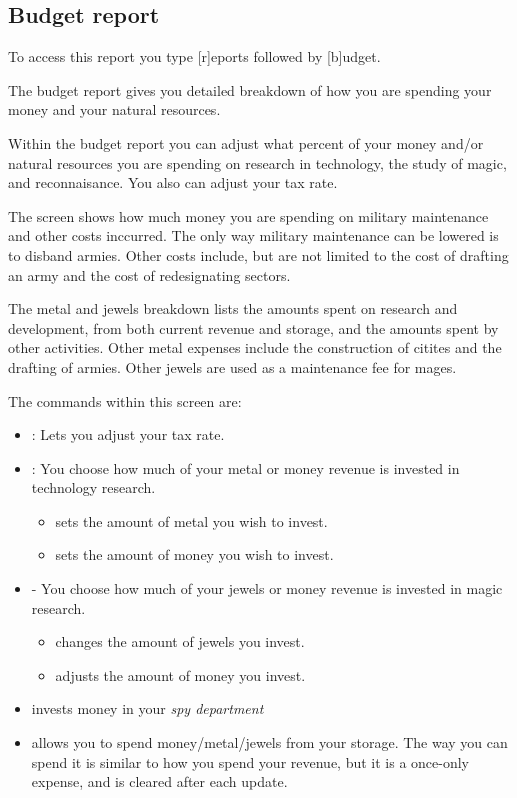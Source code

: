 \subsection{Budget report}
\label{sec-budget-report}
To access this report you type [r]eports followed by [b]udget.

The budget report gives you detailed breakdown of how you are spending your 
money and your natural resources.  

Within the budget report you can adjust what percent of your money
and/or natural resources you are spending on research in technology,
the study of magic, and reconnaisance. You also can adjust your tax
rate.

The screen shows how much money you are spending on military
maintenance and other costs inccurred. The only way military
maintenance can be lowered is to disband armies. Other costs include,
but are not limited to the cost of drafting an army and the cost of
redesignating sectors.

The metal and jewels breakdown lists the amounts spent on research and
development, from both current revenue and storage, and the amounts
spent by other activities.  Other metal expenses include the
construction of citites and the drafting of armies.  Other jewels are
used as a maintenance fee for mages.

The commands within this screen are:

\begin{itemize}
\item
{}: Lets you adjust your tax rate.
\item
{}: You choose how much of your metal or money
revenue is invested in technology research.
\begin{itemize}
\item
{} sets the amount of metal you wish to invest.
\item
{} sets the amount of money you wish to invest.
\end{itemize}
\item
{} - You choose how much of your jewels or money
revenue is invested in magic research.
\begin{itemize}
\item
{} changes the amount of jewels you invest.
\item
{} adjusts the amount of money you invest.
\end{itemize}
\item
{} invests money in your {\em spy department}
\item
{} allows you to spend money/metal/jewels from your storage.
The way you can spend it is similar to how you spend your revenue, but
it is a once-only expense, and is cleared after each update.
\end{itemize}

